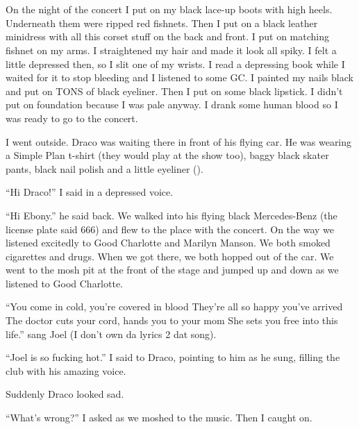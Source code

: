 \section{}


\XXX{\Xfill}

On the night of the concert I put on my black lace-up boots with high heels. Underneath them were ripped red fishnets. Then I put on a black leather minidress with all this corset stuff on the back and front. I put on matching fishnet on my arms. I straightened my hair and made it look all spiky. I felt a little depressed then, so I slit one of my wrists. I read a depressing book while I waited for it to stop bleeding and I listened to some GC. I painted my nails black and put on TONS of black eyeliner. Then I put on some black lipstick. I didn't put on foundation because I was pale anyway. I drank some human blood so I was ready to go to the concert.

I went outside. Draco was waiting there in front of his flying car. He was wearing a Simple Plan t-shirt (they would play at the show too), baggy black skater pants, black nail polish and a little eyeliner ().

\enquote{Hi Draco!} I said in a depressed voice.

\enquote{Hi Ebony.} he said back. We walked into his flying black Mercedes-Benz (the license plate said 666) and flew to the place with the concert. On the way we listened excitedly to Good Charlotte and Marilyn Manson. We both smoked cigarettes and drugs. When we got there, we both hopped out of the car. We went to the mosh pit at the front of the stage and jumped up and down as we listened to Good Charlotte.

\enquote{You come in cold, you're covered in blood
They're all so happy you've arrived
The doctor cuts your cord, hands you to your mom
She sets you free into this life.} sang Joel (I don't own da lyrics 2 dat song).

\enquote{Joel is so fucking hot.} I said to Draco, pointing to him as he sung, filling the club with his amazing voice.

Suddenly Draco looked sad.

\enquote{What's wrong?} I asked as we moshed to the music. Then I caught on.

